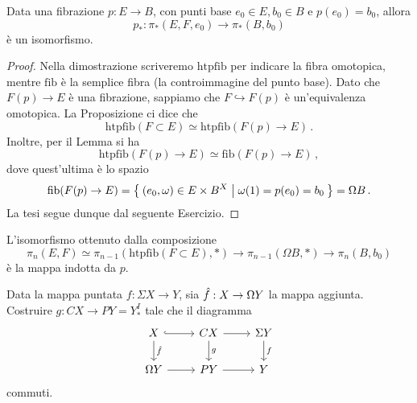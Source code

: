 \begin{lemma}
	Data una fibrazione $p:E \to B$, con punti base
	$e_{0} \in E, b_{0} \in B$ e $p(e_{0}) = b_{0}$,
	allora
	\begin{equation*}
		p_{*} : \pi_{*}(E,F,e_{0}) \longrightarrow \pi_{*}(B,b_{0})
	\end{equation*}
	è un isomorfismo.
	\begin{proof}
		Nella dimostrazione scriveremo $\mathrm{htpfib}$ per indicare la fibra omotopica,
		mentre $\mathrm{fib}$ è la semplice fibra (la controimmagine del punto base).
		Dato che $F(p) \to E$ è una fibrazione,
		sappiamo che $F \hookrightarrow F(p)$
		è un'equivalenza omotopica.
		La Proposizione ci dice che
		\begin{equation*}
			\mathrm{htpfib}(F \subset E) \simeq \mathrm{htpfib}(F(p) \to E)\,.
		\end{equation*}
		Inoltre, per il Lemma si ha
		\begin{equation*}
			\mathrm{htpfib}(F(p) \to E) \simeq \mathrm{fib}(F(p) \to E)\,,
		\end{equation*}
		dove quest'ultima è lo spazio
		\begin{equation*}
			\mathrm{fib}(F(p) \to E) = 
			\Set{(e_{0},\omega) \in E \times B^{X} | \omega(1) = p(e_{0}) = b_{0}}
			= \Omega B\,.
		\end{equation*}
		La tesi segue dunque dal seguente Esercizio.
	\end{proof}
\end{lemma}

\begin{exercise}
	L'isomorfismo ottenuto dalla composizione 
	\begin{equation*}
		\pi_{n}(E,F) \simeq \pi_{n-1}(\mathrm{htpfib}(F \subset E), \ast)
		\to \pi_{n-1}(\Omega B, \ast) \to \pi_{n}(B, b_{0})
	\end{equation*}
	è la mappa indotta da $p$.
\end{exercise}

\begin{exercise}
	Data la mappa puntata $f: \Sigma X \to Y$,
	sia $\Hat{f}:X \to \Omega Y$ la mappa aggiunta.
	Costruire $g:CX \to PY=Y^{I}_{*}$ tale che il diagramma
	\begin{equation*}
		\begin{tikzcd}
			X \ar[r, hook] \ar[d, "\Hat{f}"] 
			& CX \ar[d, "g"] \ar[r] 
			& \Sigma Y \ar[d, "f"] \\ 
			\Omega Y \ar[r] & PY \ar[r] & Y
		\end{tikzcd}
	\end{equation*}
	commuti.
\end{exercise}





